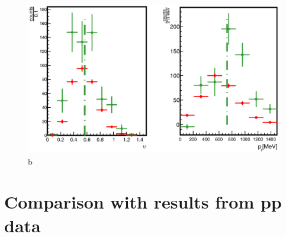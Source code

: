 \begin{figure}[ht]
  \centering
  \includegraphics[width=0.9 \linewidth]{Chapter_analysisPNb/YPt.eps}
  \caption{b}
  \label{fig:YPt_pNb}
\end{figure}

\section{Comparison with results from pp data}